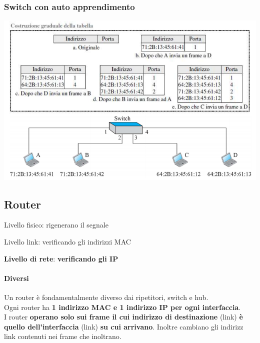 \documentclass[10pt]{article}
\begin{document}
\subsubsection{Switch con auto apprendimento}
\begin{center}
	\includegraphics[scale=0.6]{switchautoapp.png}
\end{center}
\pagebreak
\subsection{Router}
\begin{list}{}{\textbf{Operano}:}
	\item Livello fisico: rigenerano il segnale
	\item Livello link: verificando gli indirizzi MAC
	\item \textbf{Livello di rete}: \textbf{verificando gli IP}
\end{list}
\paragraph{Diversi} Un router è fondamentalmente diverso dai ripetitori, switch e hub.\\
Ogni router ha \textbf{1 indirizzo MAC e 1 indirizzo IP per ogni interfaccia}.\\
I router \textbf{operano solo sui frame il cui indirizzo di destinazione} (link) \textbf{è quello dell'interfaccia} (link) \textbf{su cui arrivano}. Inoltre cambiano gli indirizz link contenuti nei frame che inoltrano.
\end{document}

